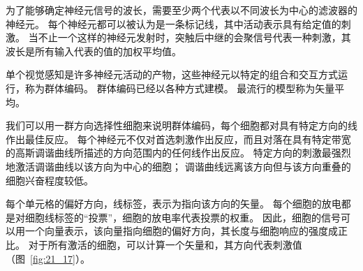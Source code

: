 为了能够确定神经元信号的波长，需要至少两个代表以不同波长为中心的滤波器的神经元。 
每个神经元都可以被认为是一条标记线，其中活动表示具有给定值的刺激。 
当不止一个这样的神经元发射时，突触后中继的会聚信号代表一种刺激，其波长是所有输入代表的值的加权平均值。


单个视觉感知是许多神经元活动的产物，这些神经元以特定的组合和交互方式运行，称为群体编码。 
群体编码已经以各种方式建模。 
最流行的模型称为矢量平均。


我们可以用一群方向选择性细胞来说明群体编码，每个细胞都对具有特定方向的线作出最佳反应。 
每个神经元不仅对首选刺激作出反应，而且对落在具有特定带宽的高斯调谐曲线所描述的方向范围内的任何线作出反应。 
特定方向的刺激最强烈地激活调谐曲线以该方向为中心的细胞； 
调谐曲线远离该方向但与该方向重叠的细胞兴奋程度较低。


每个单元格的偏好方向，线标签，表示为指向该方向的矢量。
每个细胞的放电都是对细胞线标签的“投票”，细胞的放电率代表投票的权重。
因此，细胞的信号可以用一个向量表示，该向量指向细胞的偏好方向，其长度与细胞响应的强度成正比。
对于所有激活的细胞，可以计算一个矢量和，其方向代表刺激值（图~\ref{fig:21_17}）。


